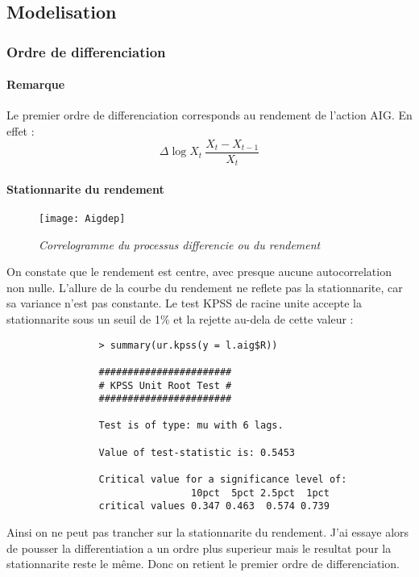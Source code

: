         \subsection{Modelisation}
            \subsubsection{Ordre de differenciation}
            \paragraph{Remarque} Le premier ordre de differenciation corresponds au rendement de
                l'action AIG. En effet :
                \[
                    \Delta \log X_t ~ \frac{X_t - X_{t-1}}{X_t}
                \]
            \paragraph{Stationnarite du rendement}
                \begin{figure}[H]
                    \centering 
                    \label{fig:Aigdep} 
                    \texttt{[image: Aigdep]} 
                    \caption{\it Correlogramme du processus
                    differencie ou du rendement  } 
                \end{figure} 

                On constate que le rendement est centre, avec presque aucune
                autocorrelation non nulle. L'allure de la courbe du rendement ne
                reflete pas la stationnarite, car sa variance n'est pas
                constante. Le test KPSS de racine unite accepte la stationnarite
                sous un seuil de 1\% et la rejette au-dela de cette
                valeur :
                \begin{verbatim}
                > summary(ur.kpss(y = l.aig$R))

                ####################### 
                # KPSS Unit Root Test # 
                ####################### 

                Test is of type: mu with 6 lags. 

                Value of test-statistic is: 0.5453 

                Critical value for a significance level of: 
                                10pct  5pct 2.5pct  1pct
                critical values 0.347 0.463  0.574 0.739

                \end{verbatim}
                Ainsi on ne peut pas trancher sur la stationnarite du rendement.
                J'ai essaye alors de pousser la differentiation a un ordre plus
                superieur mais le resultat pour la stationnarite reste le même.
                Donc on retient le premier ordre de differenciation. 

